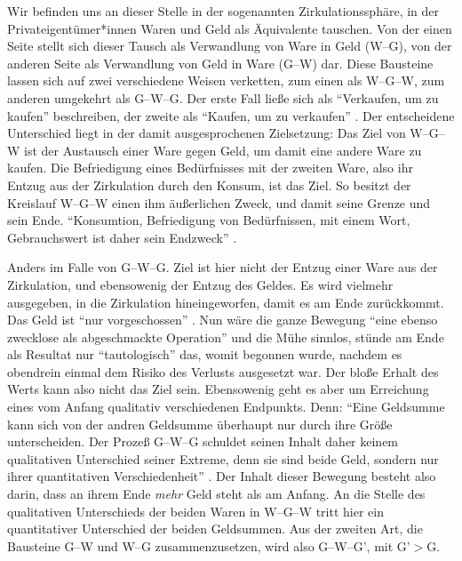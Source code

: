 \documentclass[12pt,
               DIV13,
               paper=a4,
               twoside=false,
               onehalfspacing,
               bibliography=totoc,
               toc=graduated,
               draft,
               ]{scrartcl}
\newcommand{\pc}[2]{\parencite[#1]{#2}}
\newcommand{\vgl}[2]{\parencite[vgl.][#1]{#2}}
\newcommand{\worries}[1]{\ifdraft{\textcolor{blue}{\texttt{(#1)}}}{}}
\newcommand{\gwg}{G--W--G'\xspace}
\newcommand{\wgw}{W--G--W\xspace}
\begin{document}
Wir befinden uns an dieser Stelle in der sogenannten
Zirkulationssphäre, in der Privateigentümer*innen Waren und Geld als
Äquivalente tauschen. Von der einen Seite stellt sich dieser Tausch
als Verwandlung von Ware in Geld (W--G), von der anderen Seite als
Verwandlung von Geld in Ware (G--W) dar. Diese Bausteine lassen sich
auf zwei verschiedene Weisen verketten, zum einen als \wgw, zum
anderen umgekehrt als G--W--G. Der erste Fall ließe sich als
"`Verkaufen, um zu kaufen"' beschreiben, der zweite als "`Kaufen, um
zu verkaufen"' \vgl{162}{kap}. Der entscheidene Unterschied liegt in
der damit ausgesprochenen Zielsetzung: Das Ziel von \wgw ist der
Austausch einer Ware gegen Geld, um damit eine andere Ware zu kaufen.
Die Befriedigung eines Bedürfnisses mit der zweiten Ware, also ihr
Entzug aus der Zirkulation durch den Konsum, ist das Ziel. So besitzt
der Kreislauf \wgw einen ihm äußerlichen Zweck, und damit seine Grenze
und sein Ende. "`Konsumtion, Befriedigung von Bedürfnissen, mit einem
Wort, Gebrauchswert ist daher sein Endzweck"' \pc{164}{kap}.


Anders im Falle von G--W--G. Ziel ist hier nicht der Entzug einer Ware
aus der Zirkulation, und ebensowenig der Entzug des Geldes. Es wird
vielmehr ausgegeben, in die Zirkulation hineingeworfen, damit es am
Ende zurückkommt. Das Geld ist "`nur vorgeschossen"' \pc{163}{kap}.
Nun wäre die ganze Bewegung "`eine ebenso zwecklose als abgeschmackte
Operation"' \pc{165}{kap} und die Mühe sinnlos, stünde am Ende als
Resultat nur "`tautologisch"' \pc{164}{kap} das, womit begonnen wurde,
nachdem es obendrein einmal dem Risiko des Verlusts ausgesetzt war.
Der bloße Erhalt des Werts kann also nicht das Ziel sein. Ebensowenig
geht es aber um Erreichung eines vom Anfang qualitativ verschiedenen
Endpunkts. Denn: "`Eine Geldsumme kann sich von der andren Geldsumme
überhaupt nur durch ihre Größe unterscheiden. Der Prozeß G--W--G
schuldet seinen Inhalt daher keinem qualitativen Unterschied seiner
Extreme, denn sie sind beide Geld, sondern nur ihrer quantitativen
Verschiedenheit"' \pc{165}{kap}. Der Inhalt dieser Bewegung besteht
also darin, dass an ihrem Ende \emph{mehr} Geld steht als am Anfang.
An die Stelle des qualitativen Unterschieds der beiden Waren in \wgw
tritt hier ein quantitativer Unterschied der beiden Geldsummen. Aus
der zweiten Art, die Bausteine G--W und W--G zusammenzusetzen, wird
also \gwg, mit G'$>$G.

\end{document}
